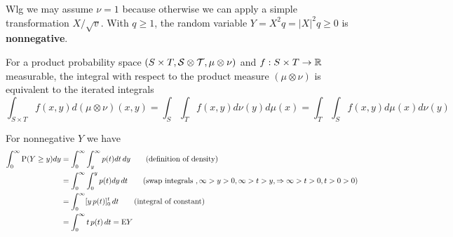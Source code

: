 \begin{prf}
Wlg we may assume $\nu = 1$ because otherwise we can apply a simple transformation $X / \sqrt{v}$.
With $q \geq 1$, the random variable $Y = X^2q = |X|^2q \geq 0$ is \textbf{nonnegative}.

\begin{theorem}[Fubini's]
For a product probability space $(S \times T, \mathcal{S} \otimes \mathcal{T}, \mu \otimes \nu)$ and $f : S \times T \to \mathbb{R}$ measurable, the integral with respect to the product measure $(\mu \otimes \nu)$ is equivalent to the iterated integrals
\begin{equation}
\int_{S \times T} f(x,y) d(\mu \otimes \nu)(x,y) = \int_{S} \int_{T} f(x,y) d \nu(y) d \mu(x) = 
\int_{T} \int_{S} f(x,y) d \mu(x) d \nu(y)
\end{equation}
\end{theorem}

For nonnegative $Y$ we have 
\begin{align*}
\int_0^\infty \mathrm{P}(Y \ge y) dy & = \int_0^\infty \int_y^\infty p(t) dt \, dy \qquad \text{(definition of density)}\\
& = \int_0^\infty \int_0^y p(t) dy \, dt \qquad \text{(swap integrals }, \infty > y > 0, \infty > t > y, \Rightarrow \infty > t > 0, t > 0 > 0)\\
& = \int_0^\infty [y \, p(t)]_0^t \, dt \qquad \text{(integral of constant)}\\
& = \int_0^\infty t \, p(t) \, dt = \mathrm{E} Y
\end{align*}


\end{prf}

